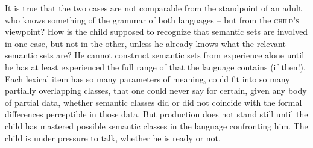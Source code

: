 It is true that the two cases are not comparable from the standpoint of an adult who knows something of the grammar of both languages -- but from the \textsc{child's} viewpoint? How is the child supposed to recognize that semantic sets are involved in one case, but not in the other, unless he already knows what the relevant semantic sets are? He cannot construct semantic sets from experience alone until he has at least experienced the full range of  that the language contains (if then!). Each lexical item has so many parameters of mean\-ing, could fit into so many partially overlapping classes, that one could never say for certain, given any body of partial data, whether semantic classes did or did not coincide with the formal differences perceptible in those data. But production does not stand still until the child has mastered possible semantic classes in the language confronting him. The child is under pressure to talk, whether he is ready or not.

